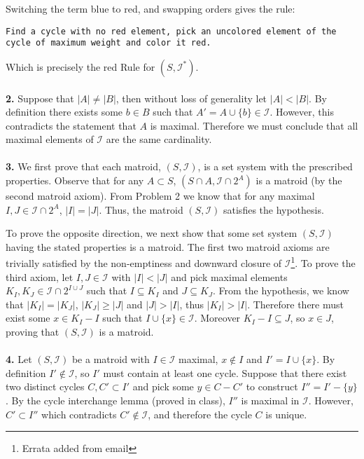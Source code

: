 \documentclass{article}
\begin{document}
\vspace{0.05in} Switching the term blue to red, and swapping orders gives the rule:

\vspace{0.05in} \noindent \texttt{\small Find a cycle with no red element, pick an uncolored element of the cycle of maximum weight and color it red. }

\vspace{0.05in} Which is precisely the red Rule for $(S, \mathcal{I}^*)$.

\paragraph{} \textbf{2.}  
Suppose that $|A| \neq |B|$, then without loss of generality let $|A| < |B|$.  By definition there exists some $b \in B$ such that $A' = A \cup \{ b \} \in \mathcal{I}$.  However, this contradicts the statement that $A$ is maximal.  Therefore we must conclude that all maximal elements of $\mathcal{I}$ are the same cardinality.

\paragraph{} \textbf{3.}
We first prove that each matroid, $(S,\mathcal{I})$, is a set system with the prescribed properties.  Observe that for any $A \subset S$, $(S \cap A, \mathcal{I} \cap 2^A)$ is a matroid (by the second matroid axiom).  From Problem 2 we know that for any maximal $I,J \in \mathcal{I} \cap 2^A$, $|I| = |J|$.  Thus, the matroid $(S, \mathcal{I})$ satisfies the hypothesis.

To prove the opposite direction, we next show that some set system $(S, \mathcal{I})$ having the stated properties is a matroid.  The first two matroid axioms are trivially satisfied by the non-emptiness and downward closure of $\mathcal{I}$\footnote{Errata added from email}.  To prove the third axiom, let $I,J \in \mathcal{I}$ with $|I| < |J|$ and pick maximal elements $K_I, K_J \in \mathcal{I} \cap 2^{I \cup J}$ such that $I \subseteq K_I$ and $J \subseteq K_J$.  From the hypothesis, we know that $|K_I| = |K_J|$, $|K_J| \geq |J|$ and $|J| > |I|$, thus $|K_I| > |I|$.  Therefore there must exist some $x \in K_I - I$ such that $I \cup \{ x \} \in \mathcal{I}$.  Moreover $K_I - I \subseteq J$, so $x \in J$, proving that $(S, \mathcal{I})$ is a matroid.

\paragraph{} \textbf{4.}
Let $(S, \mathcal{I})$ be a matroid with $I \in \mathcal{I}$ maximal, $x \notin I$ and $I' = I \cup \{ x \}$.  By definition $I' \notin \mathcal{I}$, so $I'$ must contain at least one cycle.  Suppose that there exist two distinct cycles $C, C' \subset I'$ and pick some $y \in C - C'$ to construct $I'' = I' - \{ y \}$.  By the cycle interchange lemma (proved in class), $I''$ is maximal in $\mathcal{I}$.  However, $C' \subset I''$ which contradicts $C' \notin \mathcal{I}$, and therefore the cycle $C$ is unique.
\end{document}
